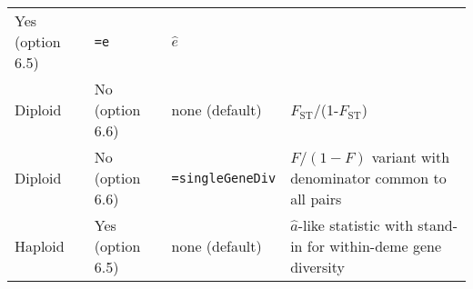 \documentclass[12pt,]{book}
\begin{document}
\begin{longtable}[]{@{}llll@{}}
\begin{minipage}[t]{0.16\columnwidth}
Yes (option 6.5)\strut
\end{minipage} & \begin{minipage}[t]{0.19\columnwidth}\raggedright\strut
\texttt{=e}\strut
\end{minipage} & \begin{minipage}[t]{0.45\columnwidth}\raggedright\strut
\(\hat{e}\)\strut
\end{minipage}\tabularnewline
\begin{minipage}[t]{0.08\columnwidth}\raggedright\strut
Diploid\strut
\end{minipage} & \begin{minipage}[t]{0.16\columnwidth}\raggedright\strut
No (option 6.6)\strut
\end{minipage} & \begin{minipage}[t]{0.19\columnwidth}\raggedright\strut
none (default)\strut
\end{minipage} & \begin{minipage}[t]{0.45\columnwidth}\raggedright\strut
\(F_\mathrm{ST}\)/(1-\(F_\mathrm{ST}\))\strut
\end{minipage}\tabularnewline
\begin{minipage}[t]{0.08\columnwidth}\raggedright\strut
Diploid\strut
\end{minipage} & \begin{minipage}[t]{0.16\columnwidth}\raggedright\strut
No (option 6.6)\strut
\end{minipage} & \begin{minipage}[t]{0.19\columnwidth}\raggedright\strut
\texttt{=singleGeneDiv}\strut
\end{minipage} & \begin{minipage}[t]{0.45\columnwidth}\raggedright\strut
\(F/(1-F)\) variant with denominator common to all pairs\strut
\end{minipage}\tabularnewline
\begin{minipage}[t]{0.08\columnwidth}\raggedright\strut
Haploid\strut
\end{minipage} & \begin{minipage}[t]{0.16\columnwidth}\raggedright\strut
Yes (option 6.5)\strut
\end{minipage} & \begin{minipage}[t]{0.19\columnwidth}\raggedright\strut
none (default)\strut
\end{minipage} & \begin{minipage}[t]{0.45\columnwidth}\raggedright\strut
\(\hat{a}\)-like statistic with stand-in for within-deme gene
diversity\strut

\end{minipage}
\end{longtable}
\end{document}
